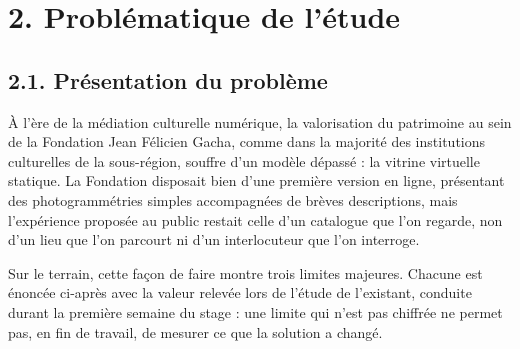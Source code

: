 \section*{2. Problématique de l'étude}

\subsection*{2.1. Présentation du problème}

À l'ère de la médiation culturelle numérique, la valorisation du patrimoine au
sein de la Fondation Jean Félicien Gacha, comme dans la majorité des
institutions culturelles de la sous-région, souffre d'un modèle dépassé : la
vitrine virtuelle statique. La Fondation disposait bien d'une première version
en ligne, présentant des photogrammétries simples accompagnées de brèves
descriptions, mais l'expérience proposée au public restait celle d'un catalogue
que l'on regarde, non d'un lieu que l'on parcourt ni d'un interlocuteur que
l'on interroge.

Sur le terrain, cette façon de faire montre trois limites majeures. Chacune est
énoncée ci-après avec la valeur relevée lors de l'étude de l'existant, conduite
durant la première semaine du stage : une limite qui n'est pas chiffrée ne
permet pas, en fin de travail, de mesurer ce que la solution a changé.

